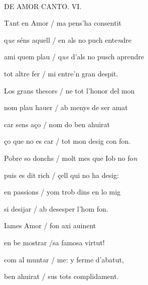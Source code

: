 \documentclass[12pt]{article}
\renewcommand{\espaiAbansEtiquetaPoema}{\vspace{0ex}}
\begin{document}
\begin{estrofa}

\espaiAbansEtiquetaPoema

\\

\begin{rubrica}

\pagina{[12r]} DE AMOR CANTO. VI.

\end{rubrica}

\end{estrofa}


\begin{estrofa}

 \textsc{Ta}nt en Amor / ma pens'ha consentit

 q\textit{ue} s\'{e}ns aquell / en als no puch ente\textit{n}dre

 ami quem plau / q\textit{ue }d'als no pusch aprendre

 tot altre fer / mi entre'n gran despit.

 Los grans thesors / ne tot l'honor del mon

 nom plau hauer / ab menys de ser amat

 car sens a\c{c}o / nom do ben ahuirat

 \c{c}o que no es car / tot mon desig con fon.

\end{estrofa}



\begin{estrofa}

 Pobre so donchs / molt mes que Iob no fo\textit{n}

 puis es dit rich / \c{c}ell qui no ha desig:

 en passions / yom trob dins en lo mig

 si desijar / ab desesper l'hom fon.

 Iames Amor / fon axi auinent

 en be mostrar /sa famosa virtut!

 com al muntar / me: y ferme d'abatut,

 ben ahuirat / sus tots complidament.

\end{estrofa}
\end{document}
